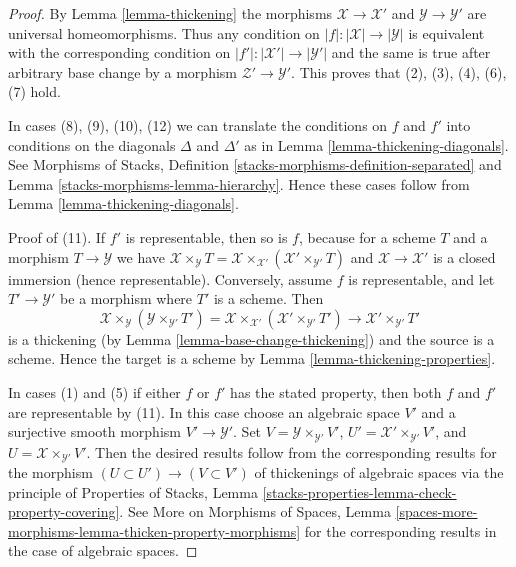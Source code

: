 \begin{proof}
By Lemma \ref{lemma-thickening} the morphisms $\mathcal{X} \to \mathcal{X}'$
and $\mathcal{Y} \to \mathcal{Y}'$ are universal homeomorphisms. Thus any
condition on $|f| : |\mathcal{X}| \to |\mathcal{Y}|$ is equivalent with
the corresponding condition on $|f'| : |\mathcal{X}'| \to |\mathcal{Y}'|$
and the same is true after arbitrary base change by a morphism
$\mathcal{Z}' \to \mathcal{Y}'$. This proves that
(2), (3), (4), (6), (7) hold.

\medskip\noindent
In cases (8), (9), (10), (12) we can translate the conditions on
$f$ and $f'$ into conditions on the diagonals $\Delta$ and $\Delta'$
as in Lemma \ref{lemma-thickening-diagonals}. See
Morphisms of Stacks, Definition \ref{stacks-morphisms-definition-separated} and
Lemma \ref{stacks-morphisms-lemma-hierarchy}.
Hence these cases follow from Lemma \ref{lemma-thickening-diagonals}.

\medskip\noindent
Proof of (11). If $f'$ is representable, then so is $f$, because
for a scheme $T$ and a morphism $T \to \mathcal{Y}$ we have
$\mathcal{X} \times_\mathcal{Y} T =
\mathcal{X} \times_{\mathcal{X}'} (\mathcal{X}' \times_{\mathcal{Y}'} T)$
and $\mathcal{X} \to \mathcal{X}'$ is a closed immersion (hence representable).
Conversely, assume $f$ is representable, and let $T' \to \mathcal{Y}'$
be a morphism where $T'$ is a scheme. Then
$$
\mathcal{X} \times_{\mathcal{Y}}
(\mathcal{Y} \times_{\mathcal{Y}'} T') =
\mathcal{X} \times_{\mathcal{X}'}
(\mathcal{X}' \times_{\mathcal{Y}'} T') \to
\mathcal{X}' \times_{\mathcal{Y}'} T'
$$
is a thickening (by Lemma \ref{lemma-base-change-thickening})
and the source is a scheme. Hence the target is a scheme by
Lemma \ref{lemma-thickening-properties}.

\medskip\noindent
In cases (1) and (5) if either $f$ or $f'$ has the stated property,
then both $f$ and $f'$ are representable by (11). In this case
choose an algebraic space $V'$ and a surjective smooth morphism
$V' \to \mathcal{Y}'$. Set $V = \mathcal{Y} \times_{\mathcal{Y}'} V'$,
$U' = \mathcal{X}' \times_{\mathcal{Y}'} V'$, and
$U = \mathcal{X} \times_{\mathcal{Y}'} V'$. Then the desired
results follow from the corresponding results for
the morphism $(U \subset U') \to (V \subset V')$ of thickenings
of algebraic spaces via the principle of Properties of Stacks, Lemma
\ref{stacks-properties-lemma-check-property-covering}.
See More on Morphisms of Spaces, Lemma
\ref{spaces-more-morphisms-lemma-thicken-property-morphisms}
for the corresponding results in the case of algebraic spaces.
\end{proof}





